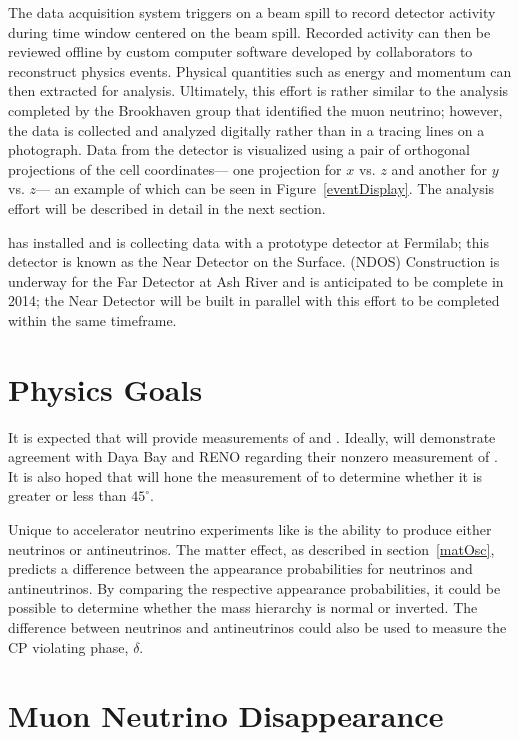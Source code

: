 The data acquisition system triggers on a \numi beam spill to record detector activity during time window centered on the beam spill.  Recorded activity can then be reviewed offline by custom computer software developed by collaborators to reconstruct physics events.  Physical quantities such as energy and momentum can then extracted for analysis.  Ultimately, this effort is rather similar to the analysis completed by the Brookhaven group that identified the muon neutrino; however, the data is collected and analyzed digitally rather than in a tracing lines on a photograph.  Data from the detector is visualized using a pair of orthogonal projections of the cell coordinates--- one projection for $x$ vs. $z$  and another for $y$ vs. $z$--- an example of which can be seen in Figure~\ref{eventDisplay}.  The analysis effort will be described in detail in the next section.  

\nova has installed and is collecting data with a prototype detector at Fermilab; this detector is known as the Near Detector on the Surface.  (NDOS)  Construction is underway for the Far Detector at Ash River and is anticipated to be complete in 2014; the Near Detector will be built in parallel with this effort to be completed within the same timeframe.  

\section{Physics Goals}
\label{goals}

It is expected that \nova will provide measurements of  \thetaoth and \thetatth.  Ideally, \nova will demonstrate agreement with Daya Bay and RENO regarding their nonzero measurement of \thetaoth.  It is also hoped that \nova will  hone the measurement of \thetatth to determine whether it is greater or less than $45^\circ$.  

Unique to accelerator neutrino experiments like \nova is the ability to produce either neutrinos or antineutrinos.  The matter effect, as described in section~\ref{matOsc}, predicts a difference between the appearance probabilities for neutrinos and antineutrinos.   By comparing the respective appearance probabilities, it could be possible to determine whether the mass hierarchy is normal or inverted.  The difference between neutrinos and antineutrinos could also be used to measure the CP violating phase, $\delta$.  

\section{Muon Neutrino Disappearance}

